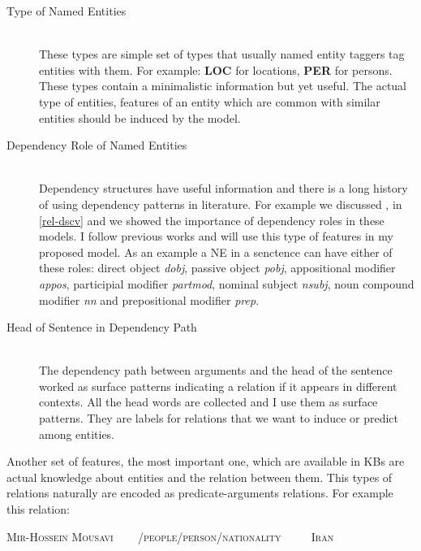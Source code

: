 \begin{description}
  
  \item[Type of Named Entities] \hfill \\
    These types are simple set of types that usually named entity taggers tag
    entities with them. For example: \textbf{LOC} for locations, \textbf{PER}
    for persons. These types contain a minimalistic information but yet useful.
    The actual type of entities, features of an entity which are common with
    similar entities should be induced by the model.
    
  \item[Dependency Role of Named Entities] \hfill \\
    Dependency structures have useful information and there is a long history of
    using dependency patterns in literature. For example we discussed
    \cite{Dirt}, \cite{patty} in \ref{rel-dscv} and we showed the importance of
    dependency roles in these models. I follow previous works and will use this
    type of features in my proposed model. As an example a NE in a senctence can
    have either of these roles: direct object \textit{dobj}, passive object
    \textit{pobj}, appositional modifier \textit{appos}, participial modifier
    \textit{partmod}, nominal subject \textit{nsubj}, noun compound modifier
    \textit{nn} and prepositional modifier \textit{prep}.
 
  \item[Head of Sentence in Dependency Path] \hfill \\
  
  The dependency path between arguments and the head of the sentence worked as
  surface patterns indicating a relation if it appears in different contexts.
  All the head words are collected and I use them as surface patterns. They are
 labels for relations that we want to induce or predict among entities. 
  
  
 \end{description}
 
 Another set of features, the most important one, which are available in KBs are
 actual knowledge about entities and the relation between them. This types of
 relations naturally are encoded as predicate-arguments relations. For example
 this relation:
\begin{center}
\label{rel:mir}
\textsc{Mir-Hossein Mousavi ~~~ /people/person/nationality  ~~~~   Iran} \hfill
\end{center}

